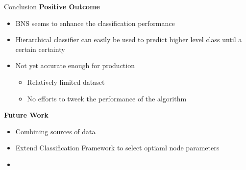 
\begin{frame}[label=conclusion]{Conclusion}
	\textbf{Positive Outcome}
	
	\begin{itemize}
	\item BNS seems to enhance the classification performance
	\item Hierarchical classifier can easily be used to predict higher level class until a certain certainty
	\item Not yet accurate enough for production
	\begin{itemize}
		\item Relatively limited dataset
		\item No efforts to tweek the performance of the algorithm
	\end{itemize}
\end{itemize}
		
	\textbf{Future Work}
	
	\begin{itemize}
		\item Combining sources of data
		\item Extend Classification Framework to select optiaml node parameters
		\item 
	\end{itemize}
	
\end{frame}
